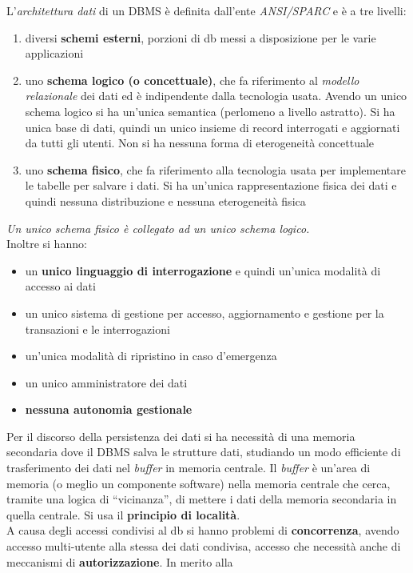 \documentclass[a4paper,12pt, oneside]{book}
\begin{document}
L'\textit{architettura dati} di un DBMS è definita dall'ente \textit{ANSI/SPARC}
e è a tre livelli:
\begin{enumerate}
  \item diversi \textbf{schemi esterni}, porzioni di db messi a disposizione per
  le varie applicazioni
  \item uno \textbf{schema logico (o concettuale)}, che fa riferimento al
  \textit{modello relazionale} dei dati ed è indipendente dalla tecnologia
  usata. Avendo un unico schema logico si ha un'unica semantica (perlomeno a
  livello astratto). Si ha unica base di dati, quindi un unico insieme di record
  interrogati e aggiornati da tutti gli utenti. Non si ha nessuna forma di
  eterogeneità concettuale 
  \item uno \textbf{schema fisico}, che fa riferimento alla tecnologia usata per
  implementare le tabelle per salvare i dati. Si ha un'unica rappresentazione
  fisica dei dati e quindi nessuna distribuzione e nessuna eterogeneità fisica
\end{enumerate}
\textit{Un unico schema fisico è collegato ad un unico schema logico.}\\
Inoltre si hanno:
\begin{itemize}
  \item un \textbf{unico linguaggio di interrogazione} e quindi un'unica
  modalità di accesso ai dati
  \item un unico sistema di gestione per accesso, aggiornamento e gestione per
  la transazioni e le interrogazioni
  \item un'unica modalità di ripristino in caso d'emergenza
  \item un unico amministratore dei dati
  \item \textbf{nessuna autonomia gestionale}
\end{itemize}
Per il discorso della persistenza dei dati si ha necessità di una memoria
secondaria dove il DBMS salva le strutture dati, studiando un modo efficiente di
trasferimento dei dati nel \textit{buffer} in memoria centrale. Il
\textit{buffer} è un'area di memoria (o meglio un componente software) nella
memoria centrale che cerca, tramite una logica di ``vicinanza'', di mettere i
dati della memoria secondaria in quella centrale. Si usa il \textbf{principio di
  località}.\\
A causa degli accessi condivisi al db si hanno problemi di \textbf{concorrenza},
avendo accesso multi-utente alla stessa dei dati condivisa, accesso che
necessità anche di meccanismi di \textbf{autorizzazione}. In merito alla
\end{document}
